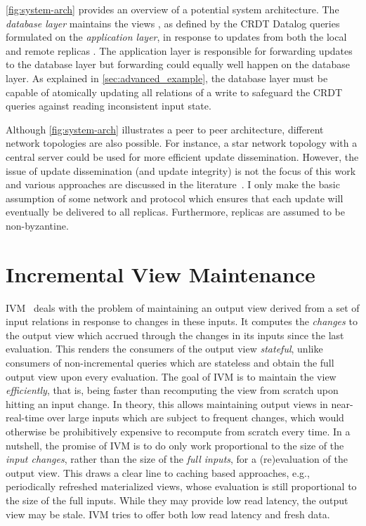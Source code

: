 

\ref{fig:system-arch} provides an overview of a potential system architecture.
The \emph{database layer} maintains the views \deltaO{},
as defined by the \ac{CRDT} Datalog queries formulated on the \emph{application layer},
in response to updates from both the local  and remote replicas
.
The application layer is responsible for forwarding updates to the database layer
but forwarding could equally well happen on the database layer.
As explained in \ref{sec:advanced_example}, the database layer must be capable
of atomically updating all relations of a write to safeguard the \ac{CRDT} queries
against reading inconsistent input state.

Although \ref{fig:system-arch} illustrates a peer to peer architecture,
different network topologies are also possible.
For instance, a star network topology with a central server could be used
for more efficient update dissemination.
However, the issue of update dissemination (and update integrity) is not the focus
of this work and various approaches are discussed in the literature~\cite{
	auvolat2019merkle, sanjuan2020merkle, kleppmann2024bluesky,
	kleppmann2022making}.
I only make the basic assumption of some network and protocol
which ensures that each update will eventually be delivered to all replicas.
Furthermore, replicas are assumed to be non-byzantine.

\section{Incremental View Maintenance}\label{sec:ivm}

\Acf{IVM}~\cite{gupta1995maintenance} deals with the problem of maintaining
an output view derived from a set of input relations in response to changes
in these inputs.
It computes the \emph{changes} to the output view which accrued through
the changes in its inputs since the last evaluation.
This renders the consumers of the output view \emph{stateful},
unlike consumers of non-incremental queries which are stateless
and obtain the full output view upon every evaluation.
The goal of \ac{IVM} is to maintain the view \emph{efficiently}, that is,
being faster than recomputing the view from scratch upon hitting an input change.
In theory, this allows maintaining output views in near-real-time over large
inputs which are subject to frequent changes, which would otherwise be
prohibitively expensive to recompute from scratch every time.
In a nutshell, the promise of \ac{IVM} is to do only work proportional to the
size of the \emph{input changes}, rather than the size of the \emph{full inputs},
for a (re)evaluation of the output view.
This draws a clear line to caching based approaches, e.g., periodically
refreshed materialized views, whose evaluation is still proportional
to the size of the full inputs.
While they may provide low read latency, the output view may be stale.
\ac{IVM} tries to offer both low read latency and fresh data.


